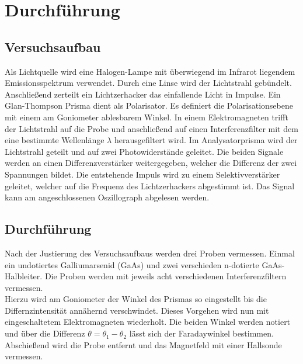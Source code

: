 \section{Durchführung}
\label{sec:Durchführung}
\subsection{Versuchsaufbau}
Als Lichtquelle wird eine Halogen-Lampe mit überwiegend im Infrarot liegendem Emissionsspektrum verwendet.
Durch eine Linse wird der Lichtstrahl gebündelt.
Anschließend zerteilt ein Lichtzerhacker das einfallende Licht in Impulse.
Ein Glan-Thompson Prisma dient als Polarisator. Es definiert die Polarisationsebene mit einem am Goniometer ablesbarem
Winkel. In einem Elektromagneten trifft der Lichtstrahl auf die Probe und anschließend auf einen
Interferenzfilter mit dem eine bestimmte Wellenlänge $\lambda$ herausgefiltert wird.
Im Analysatorprisma wird der Lichtstrahl geteilt und auf zwei Photowiderstände
geleitet. Die beiden Signale werden an einen Differenzverstärker weitergegeben,
welcher die Differenz der zwei Spannungen bildet. Die entstehende Impuls wird zu einem Selektivverstärker geleitet,
welcher auf die Frequenz des Lichtzerhackers abgestimmt ist.
Das Signal kann am angeschlossenen Oszillograph abgelesen werden.
\subsection{Durchführung}
Nach der Justierung des Versuchsaufbaus werden drei Proben vermessen. Einmal ein undotiertes
Galliumarsenid (GaAs) und zwei verschieden n-dotierte GaAs-Halbleiter. Die Proben werden mit jeweils
acht verschiedenen Interferenzfiltern vermessen.\\
Hierzu wird am Goniometer der Winkel des Prismas so eingestellt bis die Differnzintensität annähernd
verschwindet. Dieses Vorgehen wird nun mit eingeschaltetem Elektromagneten wiederholt.
Die beiden Winkel werden notiert und über die Differenz $\theta=\theta_1-\theta_2$ lässt sich der Faradaywinkel bestimmen.\\
Abschießend wird die Probe entfernt und das Magnetfeld mit einer Hallsonde vermessen.
